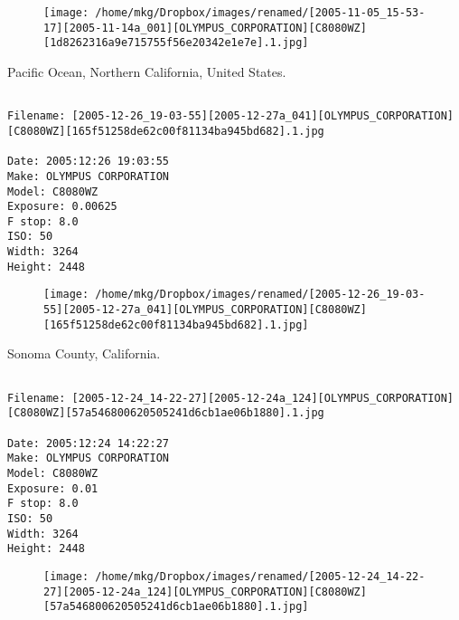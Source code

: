 \begin{figure}
\texttt{[image: /home/mkg/Dropbox/images/renamed/[2005-11-05\_15-53-17][2005-11-14a\_001][OLYMPUS\_CORPORATION][C8080WZ][1d8262316a9e715755f56e20342e1e7e].1.jpg]}
\end{figure}
    
\clearpage
\onecolumn
\noindent Pacific Ocean, Northern California, United States.
\noindent
\begin{lstlisting}

Filename: [2005-12-26_19-03-55][2005-12-27a_041][OLYMPUS_CORPORATION][C8080WZ][165f51258de62c00f81134ba945bd682].1.jpg

Date: 2005:12:26 19:03:55
Make: OLYMPUS CORPORATION
Model: C8080WZ
Exposure: 0.00625
F stop: 8.0
ISO: 50
Width: 3264
Height: 2448
\end{lstlisting}
\clearpage

\begin{figure}
\texttt{[image: /home/mkg/Dropbox/images/renamed/[2005-12-26\_19-03-55][2005-12-27a\_041][OLYMPUS\_CORPORATION][C8080WZ][165f51258de62c00f81134ba945bd682].1.jpg]}
\end{figure}
    
\clearpage
\onecolumn
\noindent Sonoma County, California.
\noindent
\begin{lstlisting}

Filename: [2005-12-24_14-22-27][2005-12-24a_124][OLYMPUS_CORPORATION][C8080WZ][57a546800620505241d6cb1ae06b1880].1.jpg

Date: 2005:12:24 14:22:27
Make: OLYMPUS CORPORATION
Model: C8080WZ
Exposure: 0.01
F stop: 8.0
ISO: 50
Width: 3264
Height: 2448
\end{lstlisting}
\clearpage

\begin{figure}
\texttt{[image: /home/mkg/Dropbox/images/renamed/[2005-12-24\_14-22-27][2005-12-24a\_124][OLYMPUS\_CORPORATION][C8080WZ][57a546800620505241d6cb1ae06b1880].1.jpg]}
\end{figure}
    
